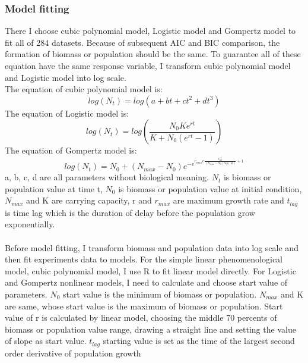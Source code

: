 \documentclass[11pt]{article}
\begin{document}
    \subsubsection{Model fitting}
      There I choose cubic polynomial model, Logistic model and Gompertz model to fit all of 284 datasets. 
      Because of subsequent AIC and BIC comparison, the formation of biomass or population should be the same. 
      To guarantee all of these equation have the same response variable, I transform cubic polynomial model and 
      Logistic model into log scale.\\ 
      The equation of cubic polynomial model is:
      \begin{equation}
        \ log(N_{t}) = log(a + b t + c t^{2} + d t^{3})\
      \end{equation}
      The equation of Logistic model is:
      \begin{equation}
        \ log(N_{t}) = log(\frac{N_{0} K e^{r t}}{K + N_{0} (e^{rt} - 1)})\
      \end{equation}
      The equation of Gompertz model is:
      \begin{equation}
        \ log(N_{t}) = N_{0} + (N_{max} - N_{0})e^{-e^{r_{max} e \frac{t_{lag}^{-t}}{(N_{max} - N_{0}) log(10)}+1}}\
      \end{equation}
      a, b, c, d are all parameters without biological meaning. 
      $N_{t}$ is biomass or population value at time t, $N_{0}$ is biomass or population value at initial condition, 
      $N_{max}$ and K are carrying capacity, r and $r_{max}$ are maximum growth rate and $t_{lag}$ is time lag which 
      is the duration of delay before the population grow exponentially. \\
      \\
      Before model fitting, I transform biomass and population data into log scale and then fit experiments data to models. 
      For the simple linear phenomenological model, cubic polynomial model, I use R to fit linear model directly. 
      For Logistic and Gompertz nonlinear models, I need to calculate and choose start value of parameters. 
      $N_{0}$ start value is the minimum of biomass or population. $N_{max}$ and K are same, whose start value is 
      the maximum of biomass or population. Start value of r is calculated by linear model, choosing the middle 70 
      percents of biomass or population value range, drawing a straight line and setting the value of slope as start 
      value. $t_{lag}$ starting value is set as the time of the largest second order derivative of population growth 
\end{document}
